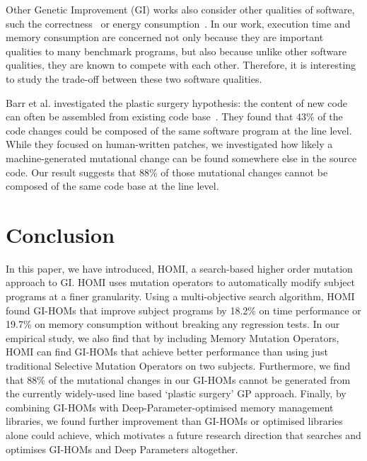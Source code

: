 \documentclass[oribibl]{llncs}
\begin{document}
{Other Genetic Improvement (GI) works also consider other qualities of software, such the correctness~\cite{6035728} or energy consumption~\cite{Bruce:2015:REC:2739480.2754752}.
In our work, execution time and memory consumption are concerned not only because they are important qualities to many benchmark programs, but also because unlike other software qualities, they are known to compete with each other.
Therefore, it is interesting to study the trade-off between these two software qualities.

Barr et al. investigated the plastic surgery hypothesis: the content of new code can often be assembled from existing code base~\cite{Barr:2014:PSH:2635868.2635898}.
They found that 43\% of the code changes could be composed of the same software program at the line level.
While they focused on human-written patches, we investigated how likely a machine-generated mutational change can be found somewhere else in the source code.
Our result suggests that 88\% of those mutational changes cannot be composed of the same code base at the line level.

\vspace{-3mm}
\section{Conclusion}
\label{sec_conclusion}
\vspace{-2mm}
In this paper, we have introduced, HOMI, a search-based higher order mutation approach to GI. HOMI uses mutation operators to automatically modify subject programs at a finer granularity. Using a multi-objective search algorithm, HOMI found GI-HOMs that improve subject programs by 18.2\% on time performance or 19.7\% on memory consumption without breaking any regression tests. In our empirical study, we also find that by including Memory Mutation Operators, HOMI can find GI-HOMs that achieve better performance than using just traditional Selective Mutation Operators on two subjects.
Furthermore, we find that 88\% of the mutational changes in our GI-HOMs cannot be generated from the currently widely-used line based `plastic surgery' GP approach. Finally, by combining GI-HOMs with Deep-Parameter-optimised memory management libraries, we found further improvement than GI-HOMs or optimised libraries alone could achieve, which motivates a future research direction that searches and optimises GI-HOMs and Deep Parameters altogether.

}
\end{document}
